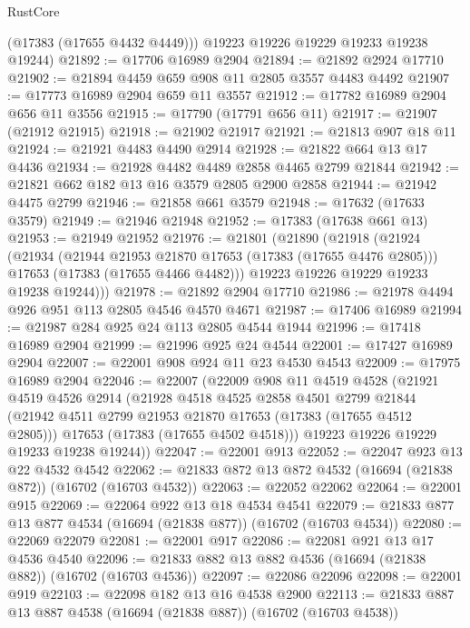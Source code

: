 \begin{lexlean}{RustCore}
\begin{coremodule}
        (@17383 (@17655 @4432 @4449)))
      @19223
      @19226
      @19229
      @19233
      @19238
      @19244)
@21892 := @17706 @16989 @2904
@21894 := @21892 @2924 @17710
@21902 := @21894 @4459 @659 @908 @11 @2805 @3557 @4483 @4492
@21907 := @17773 @16989 @2904 @659 @11 @3557
@21912 := @17782 @16989 @2904 @656 @11 @3556
@21915 := @17790 (@17791 @656 @11)
@21917 := @21907 (@21912 @21915)
@21918 := @21902 @21917
@21921 := @21813 @907 @18 @11
@21924 := @21921 @4483 @4490 @2914
@21928 := @21822 @664 @13 @17 @4436
@21934 := @21928 @4482 @4489 @2858 @4465 @2799 @21844
@21942 := @21821 @662 @182 @13 @16 @3579 @2805 @2900 @2858
@21944 := @21942 @4475 @2799
@21946 := @21858 @661 @3579
@21948 := @17632 (@17633 @3579)
@21949 := @21946 @21948
@21952 := @17383 (@17638 @661 @13)
@21953 := @21949 @21952
@21976 := @21801
    (@21890
      (@21918
        (@21924
          (@21934
            (@21944 @21953 @21870 @17653 (@17383 (@17655 @4476 @2805)))
            @17653
            (@17383 (@17655 @4466 @4482)))
          @19223
          @19226
          @19229
          @19233
          @19238
          @19244)))
@21978 := @21892 @2904 @17710
@21986 := @21978 @4494 @926 @951 @113 @2805 @4546 @4570 @4671
@21987 := @17406 @16989
@21994 := @21987 @284 @925 @24 @113 @2805 @4544 @1944
@21996 := @17418 @16989 @2904
@21999 := @21996 @925 @24 @4544
@22001 := @17427 @16989 @2904
@22007 := @22001 @908 @924 @11 @23 @4530 @4543
@22009 := @17975 @16989 @2904
@22046 := @22007
    (@22009
      @908
      @11
      @4519
      @4528
      (@21921
        @4519
        @4526
        @2914
        (@21928
          @4518
          @4525
          @2858
          @4501
          @2799
          @21844
          (@21942 @4511 @2799 @21953 @21870 @17653 (@17383 (@17655 @4512 @2805)))
          @17653
          (@17383 (@17655 @4502 @4518)))
        @19223
        @19226
        @19229
        @19233
        @19238
        @19244))
@22047 := @22001 @913
@22052 := @22047 @923 @13 @22 @4532 @4542
@22062 := @21833 @872 @13 @872 @4532 (@16694 (@21838 @872)) (@16702 (@16703 @4532))
@22063 := @22052 @22062
@22064 := @22001 @915
@22069 := @22064 @922 @13 @18 @4534 @4541
@22079 := @21833 @877 @13 @877 @4534 (@16694 (@21838 @877)) (@16702 (@16703 @4534))
@22080 := @22069 @22079
@22081 := @22001 @917
@22086 := @22081 @921 @13 @17 @4536 @4540
@22096 := @21833 @882 @13 @882 @4536 (@16694 (@21838 @882)) (@16702 (@16703 @4536))
@22097 := @22086 @22096
@22098 := @22001 @919
@22103 := @22098 @182 @13 @16 @4538 @2900
@22113 := @21833 @887 @13 @887 @4538 (@16694 (@21838 @887)) (@16702 (@16703 @4538))

\end{coremodule}
\end{lexlean}
